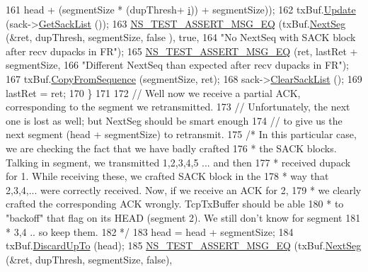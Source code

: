 \begin{DoxyCode}
161                                                     head + (segmentSize * (dupThresh+
      \hyperlink{bernuolliDistribution_8m_a6f6ccfcf58b31cb6412107d9d5281426}{i})) + segmentSize));
162       txBuf.\hyperlink{classns3_1_1TcpTxBuffer_abed2d31821b2d946068c517195f5cc61}{Update} (sack->\hyperlink{classns3_1_1TcpOptionSack_a08840a554682aeb3aadbccfbb1f6b6fa}{GetSackList} ());
163       \hyperlink{group__testing_ga2a9d78cffb3db8e867c35fff0b698cf5}{NS\_TEST\_ASSERT\_MSG\_EQ} (txBuf.\hyperlink{classns3_1_1TcpTxBuffer_ad08eadd0ba92849a4c4a6920b72acb69}{NextSeg} (&ret, dupThresh, segmentSize, \textcolor{keyword}{false}
      ), \textcolor{keyword}{true},
164                              \textcolor{stringliteral}{"No NextSeq with SACK block after recv dupacks in FR"});
165       \hyperlink{group__testing_ga2a9d78cffb3db8e867c35fff0b698cf5}{NS\_TEST\_ASSERT\_MSG\_EQ} (ret, lastRet + segmentSize,
166                              \textcolor{stringliteral}{"Different NextSeq than expected after recv dupacks in FR"});
167       txBuf.\hyperlink{classns3_1_1TcpTxBuffer_a5eb9c889cfad2cd11a5ccf996c506fd3}{CopyFromSequence} (segmentSize, ret);
168       sack->\hyperlink{classns3_1_1TcpOptionSack_ab5f3634e6e86fa9df061596696d130c5}{ClearSackList} ();
169       lastRet = ret;
170     \}
171 
172   \textcolor{comment}{// Well now we receive a partial ACK, corresponding to the segment we retransmitted.}
173   \textcolor{comment}{// Unfortunately, the next one is lost as well; but NextSeg should be smart enough}
174   \textcolor{comment}{// to give us the next segment (head + segmentSize) to retransmit.}
175   \textcolor{comment}{/* In this particular case, we are checking the fact that we have badly crafted}
176 \textcolor{comment}{   * the SACK blocks. Talking in segment, we transmitted 1,2,3,4,5 ... and then}
177 \textcolor{comment}{   * received dupack for 1. While receiving these, we crafted SACK block in the}
178 \textcolor{comment}{   * way that 2,3,4,... were correctly received. Now, if we receive an ACK for 2,}
179 \textcolor{comment}{   * we clearly crafted the corresponding ACK wrongly. TcpTxBuffer should be able}
180 \textcolor{comment}{   * to "backoff" that flag on its HEAD (segment 2). We still don't know for segment}
181 \textcolor{comment}{   * 3,4 .. so keep them.}
182 \textcolor{comment}{   */}
183   head = head + segmentSize;
184   txBuf.\hyperlink{classns3_1_1TcpTxBuffer_ad145a6de0122b3400fcbbff030d2acea}{DiscardUpTo} (head);
185   \hyperlink{group__testing_ga2a9d78cffb3db8e867c35fff0b698cf5}{NS\_TEST\_ASSERT\_MSG\_EQ} (txBuf.\hyperlink{classns3_1_1TcpTxBuffer_ad08eadd0ba92849a4c4a6920b72acb69}{NextSeg} (&ret, dupThresh, segmentSize, \textcolor{keyword}{false}), \textcolor{keyword}{
}
\end{DoxyCode}

